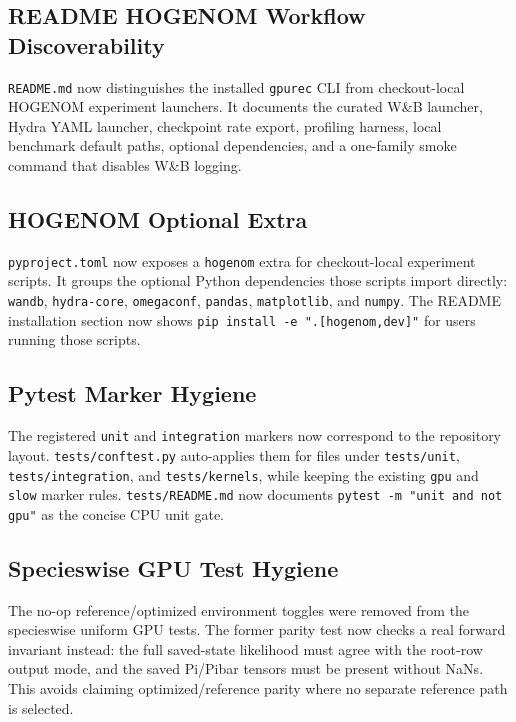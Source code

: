 \documentclass[11pt]{article}
\begin{document}
\subsection{README HOGENOM Workflow Discoverability}

\texttt{README.md} now distinguishes the installed \texttt{gpurec} CLI from
checkout-local HOGENOM experiment launchers.  It documents the curated W\&B
launcher, Hydra YAML launcher, checkpoint rate export, profiling harness,
local benchmark default paths, optional dependencies, and a one-family smoke
command that disables W\&B logging.

\subsection{HOGENOM Optional Extra}

\texttt{pyproject.toml} now exposes a \texttt{hogenom} extra for checkout-local
experiment scripts.  It groups the optional Python dependencies those scripts
import directly: \texttt{wandb}, \texttt{hydra-core}, \texttt{omegaconf},
\texttt{pandas}, \texttt{matplotlib}, and \texttt{numpy}.  The README
installation section now shows \texttt{pip install -e ".[hogenom,dev]"} for
users running those scripts.

\subsection{Pytest Marker Hygiene}

The registered \texttt{unit} and \texttt{integration} markers now correspond
to the repository layout.  \texttt{tests/conftest.py} auto-applies them for
files under \texttt{tests/unit}, \texttt{tests/integration}, and
\texttt{tests/kernels}, while keeping the existing \texttt{gpu} and
\texttt{slow} marker rules.  \texttt{tests/README.md} now documents
\texttt{pytest -m "unit and not gpu"} as the concise CPU unit gate.

\subsection{Specieswise GPU Test Hygiene}

The no-op reference/optimized environment toggles were removed from the
specieswise uniform GPU tests.  The former parity test now checks a real
forward invariant instead: the full saved-state likelihood must agree with the
root-row output mode, and the saved Pi/Pibar tensors must be present without
NaNs.  This avoids claiming optimized/reference parity where no separate
reference path is selected.
\end{document}
